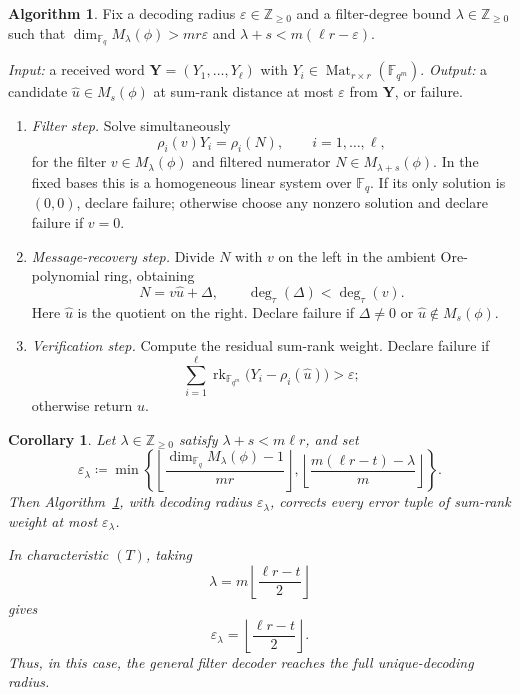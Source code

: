 \documentclass[10pt,a4paper]{amsart}
\DeclareMathOperator{\Mat}{Mat}
\DeclareMathOperator{\rk}{rk}
\theoremstyle{definition}
\newtheorem{algorithm}[definition]{Algorithm}
\theoremstyle{plain}
\newtheorem{corollary}[definition]{Corollary}
\theoremstyle{remark}
\newcommand{\vF}{\mathbb F}
\renewcommand{\epsilon}{\varepsilon}
\begin{document}
\begin{algorithm}
\label{alg:general-filter-decoder}
Fix a decoding radius $\epsilon\in\mathbb Z_{\geq 0}$ and a filter-degree
bound $\lambda\in\mathbb Z_{\geq 0}$ such that
$\dim_{\vF_q}M_\lambda(\phi)>mr\epsilon$ and
$\lambda+s<m(\ell r-\epsilon)$.

\emph{Input:} a received word $\boldsymbol Y=(Y_1,\ldots,Y_\ell)$ with
$Y_i\in\Mat_{r\times r}(\vF_{q^m})$.  \emph{Output:} a candidate
$\widehat u\in M_s(\phi)$ at sum-rank distance at most $\epsilon$ from
$\boldsymbol Y$, or failure.

\begin{enumerate}
\item \emph{Filter step.} Solve simultaneously
$$
\rho_i(v)Y_i=\rho_i(N),
\qquad i=1,\ldots,\ell,
$$
for the filter $v\in M_\lambda(\phi)$ and filtered numerator
$N\in M_{\lambda+s}(\phi)$. In the fixed bases this is a homogeneous linear
system over $\vF_q$. If its only solution is $(0,0)$, declare failure;
otherwise choose any nonzero solution and declare failure if $v=0$.

\item \emph{Message-recovery step.} Divide $N$ with $v$ on the left in the
ambient Ore-polynomial ring, obtaining
$$
N=v\widehat u+\Delta,
\qquad
\deg_\tau(\Delta)<\deg_\tau(v).
$$
Here $\widehat u$ is the quotient on the right. Declare failure if
$\Delta\neq0$ or $\widehat u\notin M_s(\phi)$.

\item \emph{Verification step.} Compute the residual sum-rank weight. Declare
failure if
$$
\sum_{i=1}^{\ell}
\rk_{\vF_{q^m}}\bigl(Y_i-\rho_i(\widehat u)\bigr)>\epsilon;
$$
otherwise return $\widehat u$.
\end{enumerate}
\end{algorithm}
\begin{corollary}
\label{cor:general-filter-radius}
Let $\lambda\in\mathbb Z_{\geq 0}$ satisfy $\lambda+s<m\ell r$, and set
$$
\epsilon_\lambda
\coloneqq
\min\left\{
\left\lfloor
\frac{\dim_{\vF_q}M_\lambda(\phi)-1}{mr}
\right\rfloor,
\left\lfloor
\frac{m(\ell r-t)-\lambda}{m}
\right\rfloor
\right\}.
$$
Then Algorithm~\ref{alg:general-filter-decoder}, with decoding radius
$\epsilon_\lambda$, corrects every error tuple of sum-rank weight at most
$\epsilon_\lambda$.

In characteristic $(T)$, taking
$$
\lambda
=
m\left\lfloor\frac{\ell r-t}{2}\right\rfloor
$$
gives
$$
\epsilon_\lambda
=
\left\lfloor\frac{\ell r-t}{2}\right\rfloor.
$$
Thus, in this case, the general filter decoder reaches the full
unique-decoding radius.
\end{corollary}
\end{document}
